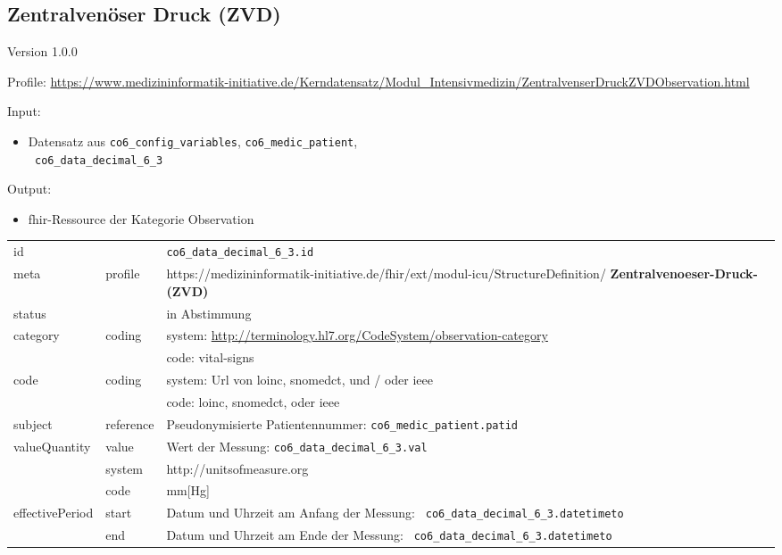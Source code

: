 \subsection{Zentralvenöser Druck (ZVD)} 
\noindent Version 1.0.0

\noindent Profile: \url{https://www.medizininformatik-initiative.de/Kerndatensatz/Modul_Intensivmedizin/ZentralvenserDruckZVDObservation.html}

\noindent Input:
\begin{itemize}
	\item Datensatz aus \texttt{co6\_config\_variables}, \texttt{co6\_medic\_patient}, \\ \texttt{
co6\_data\_decimal\_6\_3}
\end{itemize}
Output:
\begin{itemize}
        \item \ac{fhir}-Ressource der Kategorie \glqq Observation\grqq{}
\end{itemize}
\begin{longtable}{|l|l|p{7.5cm}|}
        \hline
        \rowcolor{lightgray} \multicolumn{3}{|l|}{Data Mapping (inhaltlich)} \\ \hline
        id &  & \texttt{co6\_data\_decimal\_6\_3.id} \\ \hline
	meta & profile & https://medizininformatik-initiative.de/fhir/ext/modul-icu/StructureDefinition/\textbf{
Zentralvenoeser-Druck-(ZVD)} \\ \hline 
	status &  & in Abstimmung  \\ \hline 
	category & coding & system: \url{http://terminology.hl7.org/CodeSystem/observation-category} \\
\cline{3-3}
	& & code: vital-signs \\ \hline
	code & coding & system: Url von \ac{loinc}, \ac{snomedct}, und / oder \ac{ieee} \\ 
	\cline{3-3} 
	 &  & code: \ac{loinc}, \ac{snomedct}, oder \ac{ieee} \\ \hline
	subject & reference & Pseudonymisierte Patientennummer: \texttt{co6\_medic\_patient.patid} \\ \hline
	valueQuantity & value & Wert der Messung: \texttt{co6\_data\_decimal\_6\_3.val} \\
        \cline{2-3}
         & system & http://unitsofmeasure.org \\
         \cline{2-3}
         & code & mm[Hg] \\ \hline
    effectivePeriod & start & Datum und Uhrzeit am Anfang der Messung: \texttt{
co6\_data\_decimal\_6\_3.datetimeto} \\
    \cline{2-3}
     & end & Datum und Uhrzeit am Ende der Messung: \texttt{
co6\_data\_decimal\_6\_3.datetimeto} \\ \hline
\end{longtable}
